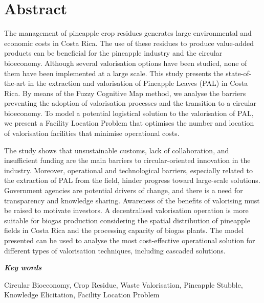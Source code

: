 \chapter*{Abstract}


\noindent The management of pineapple crop residues generates large environmental and economic costs in Costa Rica. The use of these residues to produce value-added products can be beneficial for the pineapple industry and the circular bioeconomy. Although several valorisation options have been studied, none of them have been implemented at a large scale. This study presents the state-of-the-art in the extraction and valorisation of Pineapple Leaves (PAL) in Costa Rica. By means of the Fuzzy Cognitive Map method, we analyse the barriers preventing the adoption of valorisation processes and the transition to a circular bioeconomy. To model a potential logistical solution to the valorisation of PAL, we present a Facility Location Problem that optimises the number and location of valorisation facilities that minimise operational costs. 

\noindent The study shows that unsustainable customs, lack of collaboration, and insufficient funding are the main barriers to circular-oriented innovation in the industry. Moreover, operational and technological barriers, especially related to the extraction of PAL from the field, hinder progress toward large-scale solutions. Government agencies are potential drivers of change, and there is a need for transparency and knowledge sharing. Awareness of the benefits of valorising must be raised to motivate investors. A decentralised valorisation operation is more suitable for biogas production considering
the spatial distribution of pineapple fields in Costa Rica and the processing capacity of biogas plants. The model presented can be used to analyse the most cost-effective operational solution for different types of valorisation techniques, including cascaded solutions. 


\vspace{1cm}

\noindent \textit{\textbf{Key words}}

\noindent Circular Bioeconomy, Crop Residue, Waste Valorisation, Pineapple Stubble, Knowledge Elicitation, Facility Location Problem
